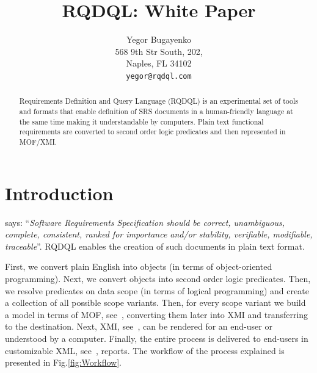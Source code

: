 \documentclass[12pt,oneside,letterpaper]{article}
\begin{document}
    \raggedright
    \setlength{\parindent}{0pt}
    \setlength{\parskip}{1em}
    \newcommand{\type}[1]{\colorbox{lightgray}{\texttt{#1}}}
    \newenvironment{maths}
    {
        \vspace*{0.5em}
        \begin{tabular}{l>{\raggedright\arraybackslash}p{20em}}
    }
    {
        \end{tabular}
        \vspace*{1em}
    }



\title{RQDQL: White Paper}
    \author{
        Yegor Bugayenko\\
        568 9th Str South, 202, \\
        Naples, FL 34102\\
        \texttt{yegor@rqdql.com}
    }
    \maketitle
    \begin{abstract}
        Requirements Definition and Query Language (RQDQL) is
        an experimental set of tools and formats that enable definition of
        SRS documents in a
        human-friendly language at the same time making it understandable
        by computers. Plain text functional requirements are converted to
        second order logic predicates and then represented in MOF/XMI.
    \end{abstract}




\section{Introduction}

    \citet{ieee830} says: ``\emph{Software Requirements Specification should be
    correct, unambiguous, complete, consistent, ranked for importance and/or stability,
    verifiable, modifiable, traceable}''. RQDQL enables the creation
    of such documents in plain text format.

    First, we convert plain English into objects (in terms of object-oriented
    programming). Next, we convert objects into second order logic predicates.
    Then, we resolve predicates on data scope (in terms of logical programming)
    and create a collection of all possible scope variants. Then, for every
    scope variant we build a model in terms of MOF, see~\citet{mof2}, converting them later
    into XMI and transferring to the destination. Next, XMI, see~\citet{mof-to-xmi}, can be rendered
    for an end-user or understood by a computer. Finally, the entire process
    is delivered to end-users in customizable XML, see~\citet{xml}, reports.
    The workflow of the process explained is presented in Fig.\ref{fig:Workflow}.
\end{document}
